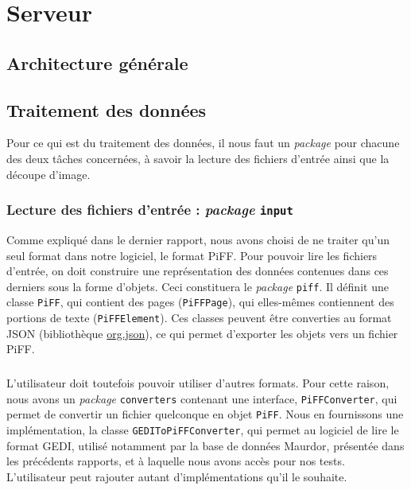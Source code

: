 \chapter{Serveur}

\section{Architecture générale}

\section{Traitement des données}

Pour ce qui est du traitement des données, il nous faut un \textit{package} pour chacune des deux tâches concernées, à savoir la lecture des fichiers d'entrée ainsi que la découpe d'image.

\subsection{Lecture des fichiers d'entrée : \textit{package} \texttt{input}}

Comme expliqué dans le dernier rapport, nous avons choisi de ne traiter qu'un seul format dans notre logiciel, le format PiFF. Pour pouvoir lire les fichiers d'entrée, on doit construire une représentation des données contenues dans ces derniers sous la forme d'objets. Ceci constituera le \textit{package} \texttt{piff}. Il définit une classe \texttt{PiFF}, qui contient des pages (\texttt{PiFFPage}), qui elles-mêmes contiennent des portions de texte (\texttt{PiFFElement}). Ces classes peuvent être converties au format JSON (bibliothèque \href{https://mvnrepository.com/artifact/org.json/json}{org.json}), ce qui permet d'exporter les objets vers un fichier PiFF.

\paragraph{}
L'utilisateur doit toutefois pouvoir utiliser d'autres formats. Pour cette raison, nous avons un \textit{package} \texttt{converters} contenant une interface, \texttt{PiFFConverter}, qui permet de convertir un fichier quelconque en objet \texttt{PiFF}. Nous en fournissons une implémentation, la classe \texttt{GEDIToPiFFConverter}, qui permet au logiciel de lire le format GEDI, utilisé notamment par la base de données Maurdor, présentée dans les précédents rapports, et à laquelle nous avons accès pour nos tests. L'utilisateur peut rajouter autant d'implémentations qu'il le souhaite.

